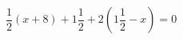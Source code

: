 \begin{ex}[type=equation]
	\begin{condition}
		\( \dfrac{1}{2}(x+8)+1\dfrac{1}{2}+2\left( 1\dfrac{1}{2}-x \right)=0 \)
	\end{condition}
\end{ex}
